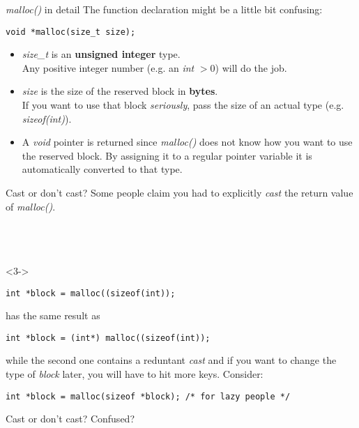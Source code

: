 \begin{frame}[fragile]{\textit{malloc()} in detail}
	The function declaration might be a little bit confusing:
	\begin{lstlisting}[numbers=none]
void *malloc(size_t size);
\end{lstlisting}
	\begin{itemize}
		\item \textit{size\_t} is an \textbf{unsigned integer} type. \\
		Any positive integer number (e.g. an \textit{int} $>0$) will do the job.
		\item \textit{size} is the size of the reserved block in \textbf{bytes}. \\
		If you want to use that block \textit{seriously}, pass the size of an actual type (e.g. \textit{sizeof(int)}).
		\item A \textit{void} pointer is returned since \textit{malloc()} does not know how you want to use the reserved block. By assigning it to a regular pointer variable it is automatically converted to that type.
	\end{itemize}
\end{frame}
\begin{frame}[fragile]{Cast or don't cast?}
	Some people claim you had to explicitly \textit{cast} the return value of \textit{malloc()}.\\
	\ \\
	 \ \\
	\ \\
	\begin{onlyenv}<3->
		\begin{lstlisting}[numbers=none]
int *block = malloc((sizeof(int));
\end{lstlisting}
	has the same result as
	\begin{lstlisting}[numbers=none]
int *block = (int*) malloc((sizeof(int));
\end{lstlisting}
	while the second one contains a reduntant \textit{cast} and if you want to change the type of \textit{block} later, you will have to hit more keys. Consider:
	\begin{lstlisting}[numbers=none]
int *block = malloc(sizeof *block); /* for lazy people */
\end{lstlisting}
	\end{onlyenv}
\end{frame}
\begin{frame}{Cast or don't cast?}
	\huge
	\centering
	Confused? \\
	\ \\
	\only<2->{Forget about type casts.}
\end{frame}
